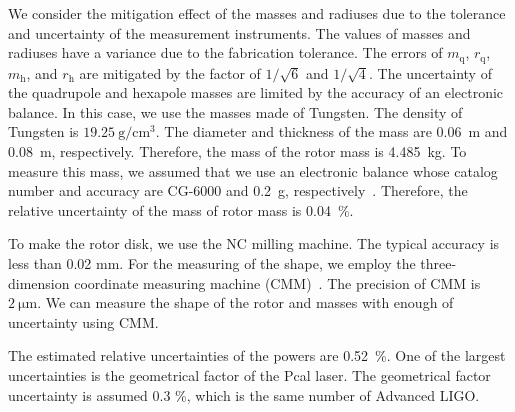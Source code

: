 \documentclass[%
 reprint,
superscriptaddress,
 amsmath,amssymb,
 aps,
]{revtex4-1}
\begin{document}
 We consider the mitigation effect of the masses and radiuses due to the tolerance and uncertainty of the measurement instruments. The values of masses and radiuses have a variance due to the fabrication tolerance. The errors of $m_{\mathrm{q}}$, $r_{\mathrm{q}}$, $m_{\mathrm{h}}$, and $r_{\mathrm{h}}$ are mitigated by the factor of $1/\sqrt{6}$ and $1/\sqrt{4}$. 
The uncertainty of the quadrupole and hexapole masses are limited by the accuracy of  an electronic balance. In this case, we use the masses made of Tungsten. The density of Tungsten is $19.25~\mathrm{g/cm^3}$. The diameter and thickness of the mass are 0.06~m and 0.08~m, respectively. Therefore, the mass of the rotor mass is 4.485~kg. To measure this mass, we assumed that we use an electronic balance whose catalog number and accuracy are CG-6000 and 0.2~g, respectively~\cite{CG6000}. Therefore, the relative uncertainty of the mass of rotor mass is 0.04~\%.

 To make the rotor disk, we use the NC milling machine. The typical accuracy is less than 0.02 mm. For the measuring of the shape, we employ the three-dimension coordinate measuring machine (CMM)~\cite{Inoue:16}. The precision of CMM is $2~\mathrm{\mu m}$. We can measure the shape of the rotor and masses with enough of uncertainty using CMM. 

The estimated relative uncertainties of the powers are 0.52~\%. One of the largest uncertainties is the geometrical factor of the Pcal laser. The geometrical factor uncertainty is assumed 0.3 \%, which is the same number of Advanced LIGO. 
\end{document}
